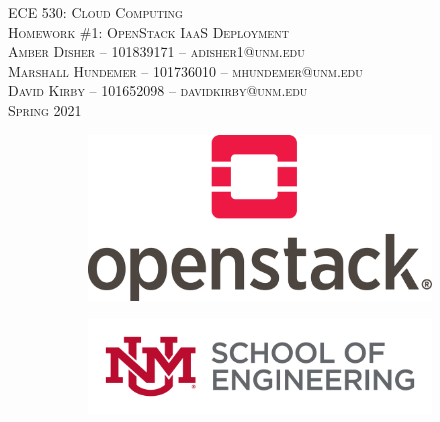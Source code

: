\documentclass{article}
\begin{document}
\setmainfont{SF Pro Text}
\setsansfont{SF Pro Text}
\setmonofont{SF Mono}
\renewcommand{\familydefault}{\sfdefault}

\thispagestyle{empty}
\begin{titlepage}
\vspace*{\fill}
\begin{center}
\textsc{\Huge{ECE 530: Cloud Computing}}\\[3em]
\textsc{\LARGE Homework \#1: OpenStack IaaS Deployment}\\[6em]
\textsc{\Large\hspace{2em} Amber Disher -- 101839171 -- adisher1@unm.edu\\[1em]
Marshall Hundemer -- 101736010 -- mhundemer@unm.edu\\[1em]
\hspace{3.5em} David Kirby -- 101652098 -- davidkirby@unm.edu}\\[3em]
\textsc{\Large Spring 2021}
\end{center}
\vfill
\begin{figure}[h]
\begin{subfigure}{0.5\textwidth}
\includegraphics[width=0.5\linewidth]{OpenStack.png}
\end{subfigure}
\begin{subfigure}{0.6\textwidth}\hspace{1em}
\includegraphics[width=0.8\linewidth]{new-soe-logo.png}
\end{subfigure}
\end{figure}
\end{titlepage}
\setcounter{figure}{0}

\tableofcontents

\listoffigures
\newpage
\setcounter{section}{+1}

\hypersetup{
    linkcolor=CrispBlue,
    urlcolor=CrispBlue,
    breaklinks=true
}
\end{document}
